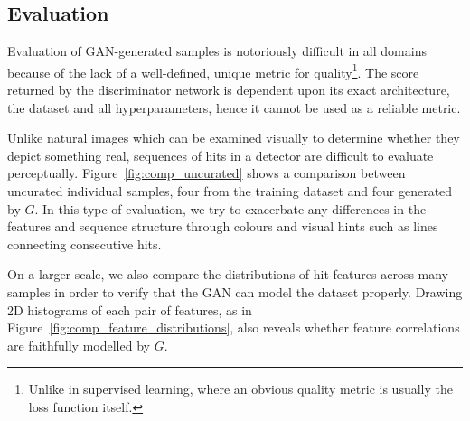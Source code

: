 



\subsection{Evaluation}
\label{sec:gan_eval}
Evaluation of GAN-generated samples is notoriously difficult in all domains
because of the lack of a well-defined, unique metric for quality\footnote{Unlike
in supervised learning, where an obvious quality metric is usually the loss
function itself.}. The score
returned by the discriminator network is dependent upon its exact architecture,
the dataset and all hyperparameters, hence it cannot be used as a reliable metric. 

Unlike natural images which can be examined visually to determine whether
they depict something real, sequences of hits in a detector are difficult to
evaluate perceptually. 
Figure~\ref{fig:comp_uncurated} shows a comparison between uncurated individual
samples, four from the training dataset and four generated by $G$. In this type
of evaluation, we try to exacerbate any differences in the features and
sequence structure through colours and visual hints such as lines connecting
consecutive hits.

On a larger scale, we also compare the distributions of hit features across many
samples in order to verify that the GAN can model the dataset properly. Drawing
2D histograms of each pair of features, as in
Figure~\ref{fig:comp_feature_distributions}, also reveals whether feature
correlations are faithfully modelled by $G$.

